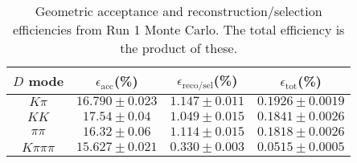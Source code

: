 \begin{table}[H]
    \centering
    \begin{tabular}{cccc}
        \toprule
        $D$ mode & $\epsilon_\mathrm{acc}$(\%) &  $\epsilon_\mathrm{reco/sel}$(\%) &  $\epsilon_\mathrm{tot}$(\%) \\
        \midrule
        $K\pi$ & $16.790 \pm 0.023$ & $1.147 \pm 0.011$ & $0.1926 \pm 0.0019$ \\
        $KK$ & $17.54 \pm 0.04$ & $1.049 \pm 0.015$ & $0.1841 \pm 0.0026$ \\
        $\pi\pi$ & $16.32 \pm 0.06$ & $1.114 \pm 0.015$ & $0.1818 \pm 0.0026$ \\
        $K\pi\pi\pi$ & $15.627 \pm 0.021$ & $0.330 \pm 0.003$ & $0.0515 \pm 0.0005$ \\
        \bottomrule
    \end{tabular}
    \caption{Geometric acceptance and reconstruction/selection efficiencies from  Run 1 Monte Carlo. The total efficiency is the  product of these.}
\label{tab:selection_efficiency_run1}
\end{table}
